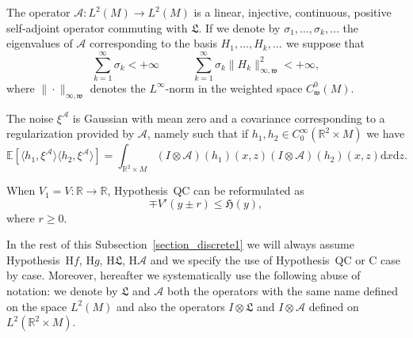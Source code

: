 \documentclass[a4paper,10pt]{article}
\newcommand{\mathd}{\mathrm{d}}
\begin{document}
{{  \item[Hypothesis~H$\mathcal{A}$.] The operator $\mathcal{A} : L^2 (M)
  \rightarrow L^2 (M)$ is a linear, injective, continuous, positive
  self-adjoint operator commuting with $\mathfrak{L}$. If we denote by
  $\sigma_1, \ldots, \sigma_k, \ldots$ the eigenvalues of $\mathcal{A}$
  corresponding to the basis $H_1, \ldots, H_k, \ldots_{}$ we suppose that
  \[ \sum_{k = 1}^{\infty} \sigma_k < + \infty \hspace{3em} \sum_{k =
     1}^{\infty} \sigma_k \| H_k \|_{\infty, \mathfrak{w}}^2 < + \infty, \]
  where $\| \cdot \|_{\infty, \mathfrak{w}}$ denotes the $L^{\infty}$-norm in
  the weighted space $C^0_{\mathfrak{w}} (M)$.
  
  \item[Hypothesis~H$\xi$.] The noise $\xi^{\mathcal{A}}$ is Gaussian with
  mean zero and a covariance corresponding to a regularization provided by
  $\mathcal{A}$, namely such that if $h_1, h_2 \in C^{\infty}_0 (\mathbb{R}^2
  \times M)$ we have
  \[ \mathbb{E} [\langle h_1, \xi^{\mathcal{A}} \rangle \langle h_2,
     \xi^{\mathcal{A}} \rangle] = \int_{\mathbb{R}^2 \times M} (I \otimes
     \mathcal{A}) (h_1) (x, z) (I \otimes \mathcal{A}) (h_2) (x, z) \mathd x
     \mathd z. \]
}}

\begin{remark}
  When $V_1 = V : \mathbb{R} \rightarrow \mathbb{R}$, Hypothesis~QC can be
  reformulated as
  \[ \mp V' (y \pm r) \leqslant \mathfrak{H} (y), \]
  where $r \geqslant 0$.
\end{remark}

In the rest of this Subsection~\ref{section_discrete1} we will always assume
Hypothesis~H$f$, H$g$, H$\mathfrak{L}$, H$\mathcal{A}$ and we specify the use
of Hypothesis~QC or C case by case. Moreover, hereafter we systematically use
the following abuse of notation: we denote by $\mathfrak{L}$ and $\mathcal{A}$
both the operators with the same name defined on the space $L^2 (M)$ and also
the operators $I \otimes \mathfrak{L}$ and $I \otimes \mathcal{A}$ defined on
$L^2 (\mathbb{R}^2 \times M)$.

\
\end{document}
